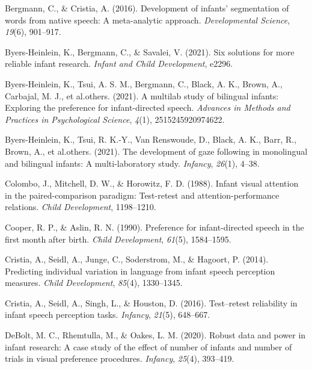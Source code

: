 \documentclass[
  man,floatsintext]{apa6}
\newlength{\cslhangindent}
\newlength{\cslentryspacingunit} %
\newenvironment{CSLReferences}[2] %
 {%
  \setlength{\parindent}{0pt}
  \ifodd #1
  \let\oldpar\par
  \def\par{\hangindent=\cslhangindent\oldpar}
  \fi
  \setlength{\parskip}{#2\cslentryspacingunit}
 }%
 {}
\begin{document}
\hypertarget{refs}{}
\begin{CSLReferences}{1}{0}
\leavevmode{}%
Bergmann, C., \& Cristia, A. (2016). Development of infants' segmentation of words from native speech: A meta-analytic approach. \emph{Developmental Science}, \emph{19}(6), 901--917.

\leavevmode{}%
Byers-Heinlein, K., Bergmann, C., \& Savalei, V. (2021). Six solutions for more reliable infant research. \emph{Infant and Child Development}, e2296.

\leavevmode{}%
Byers-Heinlein, K., Tsui, A. S. M., Bergmann, C., Black, A. K., Brown, A., Carbajal, M. J., et al.others. (2021). A multilab study of bilingual infants: Exploring the preference for infant-directed speech. \emph{Advances in Methods and Practices in Psychological Science}, \emph{4}(1), 2515245920974622.

\leavevmode{}%
Byers-Heinlein, K., Tsui, R. K.-Y., Van Renswoude, D., Black, A. K., Barr, R., Brown, A., et al.others. (2021). The development of gaze following in monolingual and bilingual infants: A multi-laboratory study. \emph{Infancy}, \emph{26}(1), 4--38.

\leavevmode{}%
Colombo, J., Mitchell, D. W., \& Horowitz, F. D. (1988). Infant visual attention in the paired-comparison paradigm: Test-retest and attention-performance relations. \emph{Child Development}, 1198--1210.

\leavevmode{}%
Cooper, R. P., \& Aslin, R. N. (1990). Preference for infant-directed speech in the first month after birth. \emph{Child Development}, \emph{61}(5), 1584--1595.

\leavevmode{}%
Cristia, A., Seidl, A., Junge, C., Soderstrom, M., \& Hagoort, P. (2014). Predicting individual variation in language from infant speech perception measures. \emph{Child Development}, \emph{85}(4), 1330--1345.

\leavevmode{}%
Cristia, A., Seidl, A., Singh, L., \& Houston, D. (2016). Test--retest reliability in infant speech perception tasks. \emph{Infancy}, \emph{21}(5), 648--667.

\leavevmode{}%
DeBolt, M. C., Rhemtulla, M., \& Oakes, L. M. (2020). Robust data and power in infant research: A case study of the effect of number of infants and number of trials in visual preference procedures. \emph{Infancy}, \emph{25}(4), 393--419.


\end{CSLReferences}
\end{document}
